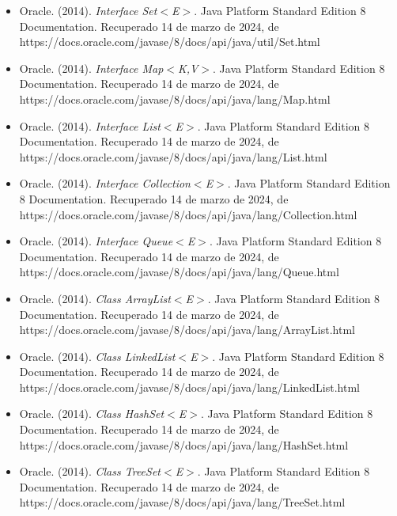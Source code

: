 \documentclass[a4paper,12pt]{article}
\begin{document}
\begin{itemize}
    \item Oracle. (2014). \textit{Interface Set$<$E$>$}. Java Platform Standard Edition 8 Documentation. Recuperado 14 de marzo de 2024, de\\https://docs.oracle.com/javase/8/docs/api/java/util/Set.html
    \item Oracle. (2014). \textit{Interface Map$<$K,V$>$}. Java Platform Standard Edition 8 Documentation. Recuperado 14 de marzo de 2024, de\\https://docs.oracle.com/javase/8/docs/api/java/lang/Map.html
    \item Oracle. (2014). \textit{Interface List$<$E$>$}. Java Platform Standard Edition 8 Documentation. Recuperado 14 de marzo de 2024, de\\https://docs.oracle.com/javase/8/docs/api/java/lang/List.html
    \item Oracle. (2014). \textit{Interface Collection$<$E$>$}. Java Platform Standard Edition 8 Documentation. Recuperado 14 de marzo de 2024, de\\https://docs.oracle.com/javase/8/docs/api/java/lang/Collection.html
    \item Oracle. (2014). \textit{Interface Queue$<$E$>$}. Java Platform Standard Edition 8 Documentation. Recuperado 14 de marzo de 2024, de\\https://docs.oracle.com/javase/8/docs/api/java/lang/Queue.html
    \item Oracle. (2014). \textit{Class ArrayList$<$E$>$}. Java Platform Standard Edition 8 Documentation. Recuperado 14 de marzo de 2024, de\\https://docs.oracle.com/javase/8/docs/api/java/lang/ArrayList.html
    \item Oracle. (2014). \textit{Class LinkedList$<$E$>$}. Java Platform Standard Edition 8 Documentation. Recuperado 14 de marzo de 2024, de\\https://docs.oracle.com/javase/8/docs/api/java/lang/LinkedList.html
    \item Oracle. (2014). \textit{Class HashSet$<$E$>$}. Java Platform Standard Edition 8 Documentation. Recuperado 14 de marzo de 2024, de\\https://docs.oracle.com/javase/8/docs/api/java/lang/HashSet.html
    \item Oracle. (2014). \textit{Class TreeSet$<$E$>$}. Java Platform Standard Edition 8 Documentation. Recuperado 14 de marzo de 2024, de\\https://docs.oracle.com/javase/8/docs/api/java/lang/TreeSet.html

\end{itemize}
\end{document}

